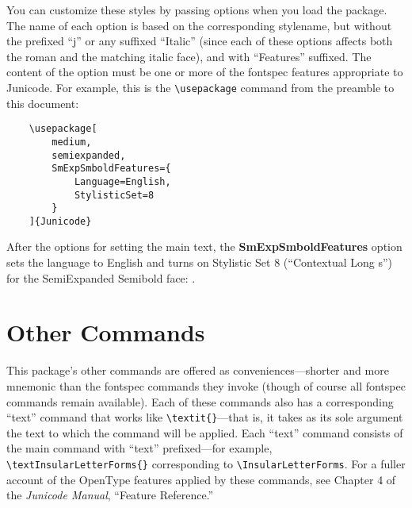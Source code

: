 \documentclass{article}
\begin{document}
\noindent You can customize these styles by passing options when you load the package.
The name of each option is based on the corresponding stylename, but without the
prefixed “j” or any suffixed “Italic” (since each of these options
affects both the roman and the matching italic face), and with “Features” suffixed.
The content of the option must be one or more of the fontspec features appropriate to
Junicode. For example, this is the {\verb|\usepackage|} command from the preamble to
this document:

\begin{verbatim}
    \usepackage[
        medium,
        semiexpanded,
        SmExpSmboldFeatures={
            Language=English,
            StylisticSet=8
        }
    ]{Junicode}
\end{verbatim}

\noindent After the options for setting the main text, the \textbf{SmExpSmboldFeatures}
option sets the language to English and turns on Stylistic Set 8 (“Contextual Long s”)
for the SemiExpanded Semibold face:
{\jSmExpSmbold {}}.

\section{Other Commands}

This package's other commands are offered as conveniences---shorter and more
mnemonic than the fontspec commands they invoke (though of course all fontspec commands
remain available). Each of these commands
also has a corresponding “text” command that works like 
{\verb|\textit{}|}—that is, it takes
as its sole argument the text to which the command will be applied. Each “text” command
consists of the main command with “text” prefixed—for example,
{\verb|\textInsularLetterForms{}|}
corresponding to {\verb|\InsularLetterForms|}.  For a fuller account of the OpenType features
applied by these commands, see Chapter 4 of the \textit{Junicode Manual}, “Feature Reference.”
\end{document}
